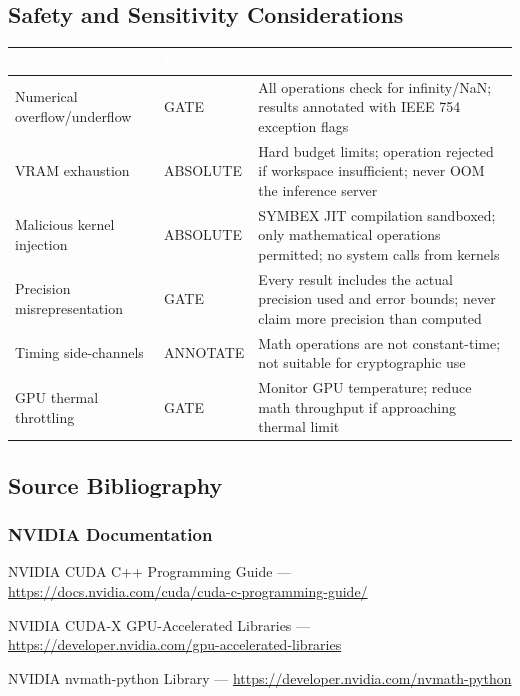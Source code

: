 \documentclass[11pt,letterpaper]{article}
\newcommand{\tableheader}[1]{\textbf{\sffamily\textcolor{white}{#1}}}
\begin{document}
\subsection{Safety and Sensitivity Considerations}

\begin{center}
\begin{tabularx}{\textwidth}{L{4cm}C{2cm}X}
\toprule
{}
\tableheader{Consideration} & \tableheader{Boundary} & \tableheader{Mitigation} \\
\midrule
Numerical overflow/underflow & GATE & All operations check for infinity/NaN; results annotated with IEEE 754 exception flags \\
VRAM exhaustion & ABSOLUTE & Hard budget limits; operation rejected if workspace insufficient; never OOM the inference server \\
Malicious kernel injection & ABSOLUTE & SYMBEX JIT compilation sandboxed; only mathematical operations permitted; no system calls from kernels \\
Precision misrepresentation & GATE & Every result includes the actual precision used and error bounds; never claim more precision than computed \\
Timing side-channels & ANNOTATE & Math operations are not constant-time; not suitable for cryptographic use \\
GPU thermal throttling & GATE & Monitor GPU temperature; reduce math throughput if approaching thermal limit \\
\bottomrule
\end{tabularx}
\end{center}

\subsection{Source Bibliography}

\subsubsection{NVIDIA Documentation}

NVIDIA CUDA C++ Programming Guide --- \url{https://docs.nvidia.com/cuda/cuda-c-programming-guide/}

NVIDIA CUDA-X GPU-Accelerated Libraries --- \url{https://developer.nvidia.com/gpu-accelerated-libraries}

NVIDIA nvmath-python Library --- \url{https://developer.nvidia.com/nvmath-python}
\end{document}

